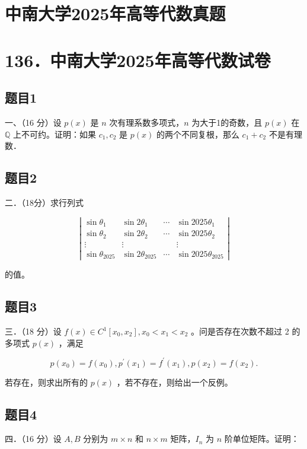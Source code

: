 \documentclass{article}
\begin{document}
\section*{中南大学2025年高等代数真题}
\section*{136．中南大学2025年高等代数试卷}

\subsection{题目1}
一、（16 分）设 \(p(x)\) 是 \(n\) 次有理系数多项式，\(n\) 为大于1的奇数，且 \(p(x)\) 在 \(\mathbb{Q}\) 上不可约。证明：如果 \(c_{1}, c_{2}\) 是 \(p(x)\) 的两个不同复根，那么 \(c_{1}+c_{2}\) 不是有理数．

\subsection{题目2}
二．（18分）求行列式

\[
\left|\begin{array}{cccc}
\sin \theta_{1} & \sin 2 \theta_{1} & \cdots & \sin 2025 \theta_{1} \\
\sin \theta_{2} & \sin 2 \theta_{2} & \cdots & \sin 2025 \theta_{2} \\
\vdots & \vdots & & \vdots \\
\sin \theta_{2025} & \sin 2 \theta_{2025} & \cdots & \sin 2025 \theta_{2025}
\end{array}\right|
\]

的值。

\subsection{题目3}
三．（18 分）设 \(f(x) \in C^{1}\left[x_{0}, x_{2}\right], x_{0}<x_{1}<x_{2}\) 。问是否存在次数不超过 2 的多项式 \(p(x)\) ，满足

\[
p\left(x_{0}\right)=f\left(x_{0}\right), p^{\prime}\left(x_{1}\right)=f^{\prime}\left(x_{1}\right), p\left(x_{2}\right)=f\left(x_{2}\right) .
\]

若存在，则求出所有的 \(p(x)\) ，若不存在，则给出一个反例。

\subsection{题目4}
四．（16 分）设 \(A, B\) 分别为 \(m \times n\) 和 \(n \times m\) 矩阵，\(I_{n}\) 为 \(n\) 阶单位矩阵。证明：
\end{document}
